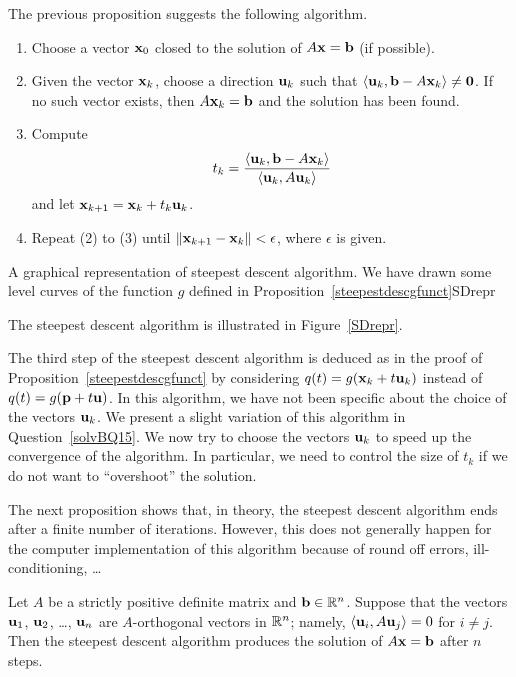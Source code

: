 The previous proposition suggests the following algorithm.

\begin{algo} \label{SteepDescAlgo}
\begin{enumerate}
\item Choose a vector $\mathbf{x}_{0}$ closed to the solution of
$A \mathbf{x} = \mathbf{b}$ (if possible).
\item Given the vector $\mathbf{x}_{k}$, choose a direction $\mathbf{u}_k$
such that $\left\langle{\mathbf{u}_k} , {\mathbf{b} - A\mathbf{x}_k}\right\rangle \neq \mathbf{0}$.  If no
such vector exists, then $A\mathbf{x}_k = \mathbf{b}$ and the
solution has been found.
\item Compute
\[
t_k = \frac{\left\langle{\mathbf{u}_k} , {\mathbf{b} -
    A\mathbf{x}_k}\right\rangle}{\left\langle{\mathbf{u}_k} , {A\mathbf{u}_k}\right\rangle}
\]
and let
$\mathbf{x}_{k+1} = \mathbf{x}_k + t_k \mathbf{u}_k$.
\item Repeat (2) to (3) until
$\| \mathbf{x}_{k+1} - \mathbf{x}_{k} \| < \epsilon$,
where $\epsilon$ is given.
\end{enumerate}
\end{algo}

{A graphical representation of steepest descent algorithm.  We have
drawn some level curves of the function $g$ defined in
Proposition~\ref{steepestdescgfunct}}{SDrepr}

The steepest descent algorithm is illustrated in Figure~\ref{SDrepr}.

The third step of the steepest descent algorithm is deduced as in the
proof of Proposition~\ref{steepestdescgfunct} by considering
$q(t) = g(\mathbf{x}_k + t \mathbf{u}_k)$ instead of
$q(t) = g(\mathbf{p} + t \mathbf{u})$.  In this algorithm, we
have not been specific about the choice of the vectors $\mathbf{u}_k$.
We present a slight variation of this algorithm in
Question~\ref{solvBQ15}.  We now try to choose the vectors $\mathbf{u}_k$
to speed up the convergence of the algorithm.  In particular, we need
to control the size of $t_k$ if we do not want to ``overshoot'' the
solution.

The next proposition shows that, in theory, the steepest descent algorithm ends
after a finite number of iterations.  However, this does not generally
happen for the computer implementation of this algorithm because of
round off errors, ill-conditioning, \ldots

\begin{prop}
Let $A$ be a strictly positive definite matrix and $\mathbf{b}\in\mathbb{R}^n$.
Suppose that the vectors
$\mathbf{u}_1$, $\mathbf{u}_2$, \ldots , $\mathbf{u}_n$ are $A$-orthogonal
vectors in $\mathbb{R}^n$; namely, $\left\langle{\mathbf{u}_i} , {A\mathbf{u}_j}\right\rangle = 0$ for
$i\neq j$.  Then the steepest descent algorithm produces the solution
of $A\mathbf{x}=\mathbf{b}$ after $n$ steps.
\end{prop}

